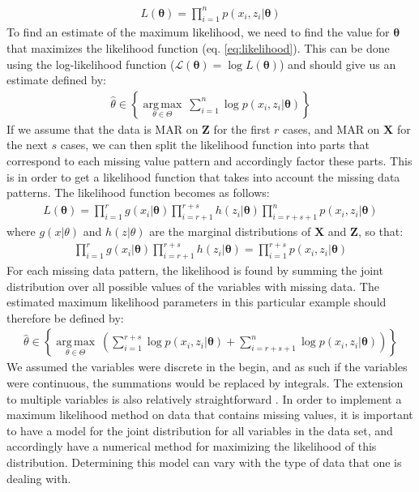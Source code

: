 \documentclass[../thesis.tex]{subfiles}
\begin{document}
\begin{align}
    L(\boldsymbol{\theta}) = \prod_{i=1}^n p(x_i, z_i | \boldsymbol{\theta})
    \label{eq:likelihood}
\end{align}
\noindent To find an estimate of the maximum likelihood, we need to find the value for $\boldsymbol{\theta}$ that maximizes the likelihood function (eq. \ref{eq:likelihood}). This can be done using the log-likelihood function ($\mathcal{L} (\boldsymbol{\theta}) = \log L(\boldsymbol{\theta})$) and should give us an estimate defined by:
\begin{align}
    {\displaystyle {\hat {\theta }}\in \left \{{\underset {\theta \in \Theta }{\operatorname {arg\,max} }}\ \sum_{i=1}^n\log p (x_i, z_i | \boldsymbol{\theta})\right \}}
\end{align}
\noindent If we assume that the data is MAR on $\boldsymbol{Z}$ for the first $r$ cases, and MAR on $\boldsymbol{X}$ for the next $s$ cases, we can then split the likelihood function into parts that correspond to each missing value pattern and accordingly factor these parts. This is in order to get a likelihood function that takes into account the missing data patterns. The likelihood function becomes as follows:
\begin{align}
    L(\boldsymbol{\theta}) = \prod_{i=1}^r g(x_i | \boldsymbol{\theta})\prod_{i=r+1}^{r+s} h(z_i | \boldsymbol{\theta})\prod_{i=r+s+1}^n p(x_i, z_i | \boldsymbol{\theta}) 
\end{align}
\noindent where $g(x | \theta)$ and $h(z | \theta)$ are the marginal distributions of $\boldsymbol{X}$ and $\boldsymbol{Z}$, so that:
\begin{align}
    \prod_{i = 1}^r g(x_i | \boldsymbol{\theta}) \prod_{i = r + 1}^{r + s} h(z_i | \boldsymbol{\theta}) = \prod_{i=1}^{r+s} p(x_i, z_i | \boldsymbol{\theta})
\end{align}
\noindent For each missing data pattern, the likelihood is found by summing the joint distribution over all possible values of the variables with missing data. The estimated maximum likelihood parameters in this particular example should therefore be defined by:
\begin{align}
    {\displaystyle {\hat {\theta }}\in \left \{{\underset {\theta \in \Theta }{\operatorname {arg\,max} }}\ \left(\sum_{i=1}^{r+s}\log p(x_i, z_i | \boldsymbol{\theta}) + \sum_{i=r+s+1}^n\log p (x_i, z_i | \boldsymbol{\theta})\right)  \right\}}
\end{align}
\noindent We assumed the variables were discrete in the begin, and as such if the variables were continuous, the summations would be replaced by integrals. The extension to multiple variables is also relatively straightforward \citep{allison1999missing}. In order to implement a maximum likelihood method on data that contains missing values, it is important to have a model for the joint distribution for all variables in the data set, and accordingly have a numerical method for maximizing the likelihood of this distribution. Determining this model can vary with the type of data that one is dealing with.\\
\end{document}
